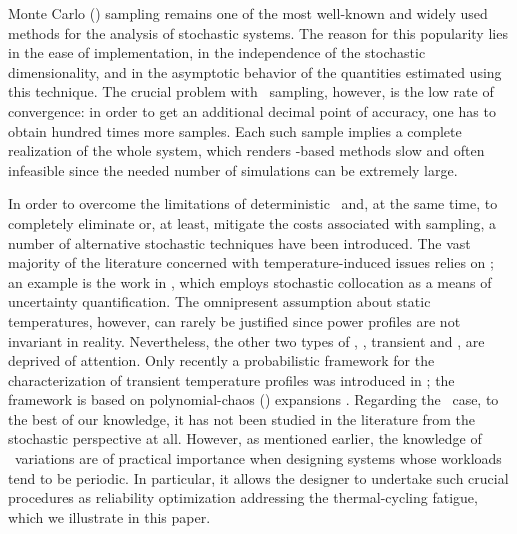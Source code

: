 Monte Carlo (\MC) sampling remains one of the most well-known and widely used methods for the analysis of stochastic systems.
The reason for this popularity lies in the ease of implementation, in the independence of the stochastic dimensionality, and in the asymptotic behavior of the quantities estimated using this technique.
The crucial problem with \MC\ sampling, however, is the low rate of convergence: in order to get an additional decimal point of accuracy, one has to obtain hundred times more samples.
Each such sample implies a complete realization of the whole system, which renders \MC-based methods slow and often infeasible since the needed number of simulations can be extremely large.

In order to overcome the limitations of deterministic \ta\ and, at the same time, to completely eliminate or, at least, mitigate the costs associated with  sampling, a number of alternative stochastic techniques have been introduced.
The vast majority of the literature concerned with temperature-induced issues relies on \sssta; an example is the work in \cite{lee2013}, which employs stochastic collocation \cite{maitre2010} as a means of uncertainty quantification.
The omnipresent assumption about static temperatures, however, can rarely be justified since power profiles are not invariant in reality.
Nevertheless, the other two types of \ta, \ie, transient and \DSS, are deprived of attention.
Only recently a probabilistic framework for the characterization of transient temperature profiles was introduced in \cite{ukhov2014}; the framework is based on polynomial-chaos (\PC) expansions \cite{maitre2010}.
Regarding the \DSS\ case, to the best of our knowledge, it has not been studied in the literature from the stochastic perspective at all.
However, as mentioned earlier, the knowledge of \DSS\ variations are of practical importance when designing systems whose workloads tend to be periodic.
In particular, it allows the designer to undertake such crucial procedures as reliability optimization addressing the thermal-cycling fatigue, which we illustrate in this paper.
